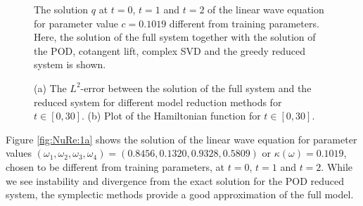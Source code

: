 \documentclass[final]{siamart}
\begin{document}
\begin{figure}

\begin{minipage}{.5\linewidth}
\centering
{}
\end{minipage}\begin{minipage}{.5\linewidth}
\centering
{}
\end{minipage}\par\medskip
\centering
{}
\caption{The solution $q$ at $t=0$, $t=1$ and $t=2$ of the linear wave equation for parameter value $c= 0.1019$ different from training parameters. Here, the solution of the full system together with the solution of the POD, cotangent lift, complex SVD and the greedy reduced system is shown.}
\label{fig:NuRe:1}
\end{figure}

\begin{figure}

\begin{minipage}{.5\linewidth}
\centering
{}
\end{minipage}\begin{minipage}{.5\linewidth}
\centering
{}
\end{minipage}\par\medskip
\centering

\caption{{{\color{black}} (a) The $L^2$-error between the solution of the full system and the reduced system for different model reduction methods for $t \in [0,30]$.} (b) Plot of the Hamiltonian function for $t \in [0,30]$. }
\label{fig:NuRe:2}
\end{figure}

Figure \ref{fig:NuRe:1a} shows the solution of the linear wave equation for parameter values {{\color{black}} $(\omega_1,\omega_2,\omega_3,\omega_4) = (0.8456,0.1320,0.9328,0.5809)$ or $\kappa(\omega) = 0.1019$}, chosen to be different from training parameters, at $t=0$, $t = 1$ and $t=2$. While we see instability and divergence from the exact solution for the POD reduced system, the symplectic methods provide a good approximation of the full model. 
\end{document}
